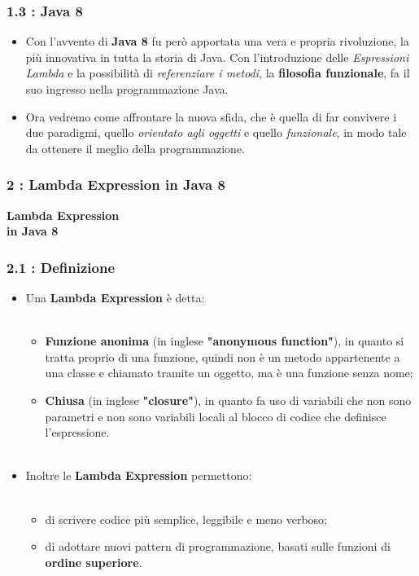 \documentclass{beamer}
\begin{document}

\begin{frame}
	\frametitle{\textbf{1.3 : Java 8}}
	\begin{itemize}
		\item
			Con l'avvento di \textbf{Java 8} fu però apportata una vera e propria rivoluzione, la più innovativa in tutta la storia di Java. Con l'introduzione delle \textit{Espressioni Lambda} e la possibilità di \textit{referenziare i metodi}, la \textbf{filosofia funzionale}, fa il suo ingresso nella programmazione Java.
		\item
			Ora vedremo come affrontare la nuova sfida, che è quella di far convivere i due paradigmi, quello \textit{orientato agli oggetti} e quello \textit{funzionale}, in modo tale da ottenere il meglio della programmazione.				
	\end{itemize}
\end{frame}


\begin{frame}
	\frametitle{\textbf{2 : Lambda Expression in Java 8}}
	\begin{center}
		\textbf{\Huge Lambda Expression\\ in Java 8}
	\end{center}
\end{frame}


\begin{frame}
	\frametitle{\textbf{2.1 : Definizione}}
	\begin{itemize}
			\item
				Una \textbf{Lambda Expression} è detta:\\\
				\begin{itemize}
					\item
						\textbf{Funzione anonima} (in inglese \textbf{"anonymous function"}), in quanto si tratta proprio di una funzione, quindi non è un metodo appartenente a una classe e chiamato tramite un oggetto, ma è una funzione senza nome;
					\item \textbf{Chiusa} (in inglese \textbf{"closure"}), in quanto fa uso di variabili che non sono parametri e non sono variabili locali al blocco di codice che definisce l'espressione.\\\
				\end{itemize}
			\item
				Inoltre le \textbf{Lambda Expression} permettono:\\\
				\begin{itemize}
					\item
						di scrivere codice più semplice, leggibile e meno verboso;
					\item
						di adottare nuovi pattern di programmazione, basati sulle funzioni di \textbf{ordine superiore}.
				\end{itemize}				
	\end{itemize}
\end{frame}
\end{document}
